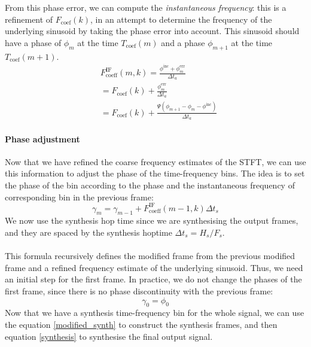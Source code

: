 \documentclass[letterpaper]{article}
\theoremstyle{definition}
\theoremstyle{remark}
\begin{document}
From this phase error, we can compute the \emph{instantaneous frequency}: this
is a refinement of \(F_{\text{coef}}(k)\), in an attempt to determine the
frequency of the underlying sinusoid by taking the phase error into account.
This sinusoid should have a phase of
\(\phi_m\) at the time \(T_{\text{coef}}(m)\) and a phase \(\phi_{m+1}\) at
the time \(T_{\text{coef}}(m+1)\).
\begin{align}
	&F_{\text{coeff}}^{\text{IF}}(m,k)=\frac{\phi^{\text{inc}} + \phi^{\text{err}}_m}{\Delta t_a}\\
	&=F_{\text{coef}}(k) + \frac{\phi^{\text{err}}_m}{\Delta t_a}\\
	&=F_{\text{coef}}(k) + \frac{\Psi(\phi_{m+1} - \phi_m - \phi^{\text{inc}})}{\Delta t_a}
\end{align}

\paragraph{Phase adjustment}
Now that we have refined the coarse frequency estimates of the STFT, we can use
this information to adjust the phase of the time-frequency bins. The idea is to
set the phase of the bin according to the phase and the instantaneous frequency
of corresponding bin in the previous frame:
\begin{equation}
	\gamma_m=\gamma_{m-1} + F_{\text{coeff}}^{\text{IF}}(m-1,k)\Delta t_s
\end{equation}
We now use the synthesis hop time since we are synthesising the output frames,
and they are spaced by the synthesis hoptime \(\Delta t_s=H_s/F_s\).

\paragraph{}
This formula recursively defines the modified frame from the previous modified
frame and a refined frequency estimate of the underlying sinusoid. Thus, we
need an initial step for the first frame. In practice, we do not change the
phases of the first frame, since there is no phase discontinuity with the
previous frame:
\begin{equation}
	\label{initial_phase}
	\gamma_0=\phi_0
\end{equation}
Now that we have a synthesis time-frequency bin for the whole signal, we can
use the equation \eqref{modified_synth} to construct the synthesis frames, and
then equation \eqref{synthesis} to synthesise the final output signal.
\end{document}
